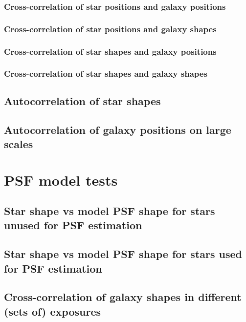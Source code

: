 \documentclass{article}
\begin{document}
\subsubsection{Cross-correlation of star positions and galaxy positions}

\subsubsection{Cross-correlation of star positions and galaxy shapes}

\subsubsection{Cross-correlation of star shapes and galaxy positions}

\subsubsection{Cross-correlation of star shapes and galaxy shapes}

\subsection{Autocorrelation of star shapes}

\subsection{Autocorrelation of galaxy positions on large scales}

\section{PSF model tests}

\subsection{Star shape vs model PSF shape for stars unused for PSF estimation}

\subsection{Star shape vs model PSF shape for stars used for PSF estimation}

\subsection{Cross-correlation of galaxy shapes in different (sets of) exposures}
\end{document}
